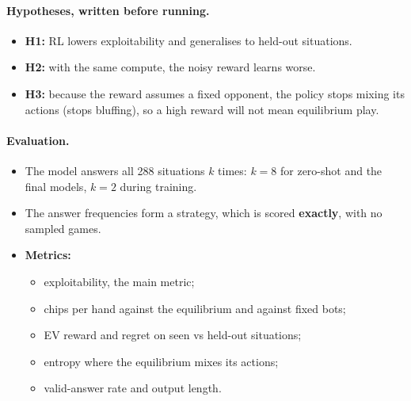 \documentclass[10.5pt]{article}
\begin{document}
\paragraph{Hypotheses, written before running.}
\begin{itemize}
\item \textbf{H1:} RL lowers exploitability and generalises to held-out situations.
\item \textbf{H2:} with the same compute, the noisy reward learns worse.
\item \textbf{H3:} because the reward assumes a fixed opponent, the policy stops mixing its actions (stops bluffing), so a
  high reward will not mean equilibrium play.
\end{itemize}

\paragraph{Evaluation.}
\begin{itemize}
\item The model answers all 288 situations $k$ times: $k=8$ for zero-shot and the final models, $k=2$ during training.
\item The answer frequencies form a strategy, which is scored \textbf{exactly}, with no sampled games.
\item \textbf{Metrics:}
  \begin{itemize}
  \item exploitability, the main metric;
  \item chips per hand against the equilibrium and against fixed bots;
  \item EV reward and regret on seen vs held-out situations;
  \item entropy where the equilibrium mixes its actions;
  \item valid-answer rate and output length.
  \end{itemize}
\end{itemize}
\end{document}
